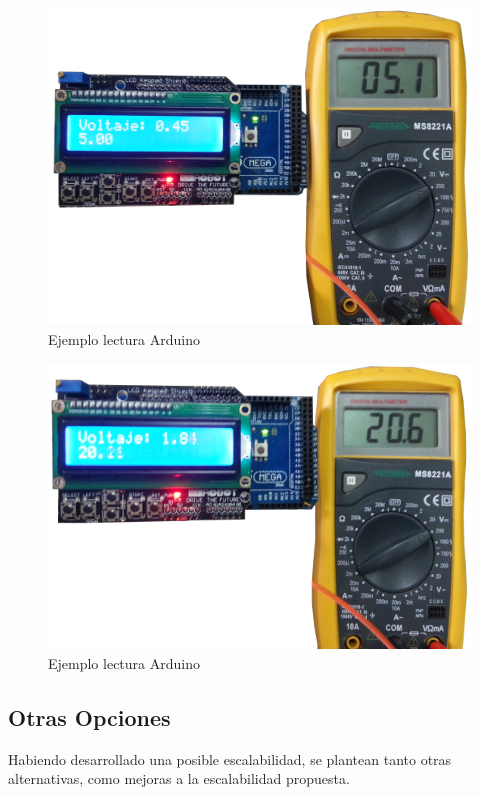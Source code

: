 \documentclass[12pt,a4paper]{article}
\begin{document}
			\begin{figure}[H]
			\centering
				\includegraphics[scale=0.7]{images/arduino5.png}\caption{Ejemplo lectura Arduino}
			\end{figure}

			\begin{figure}[H]
			\centering
				\includegraphics[scale=0.7]{images/arduino6.png}\caption{Ejemplo lectura Arduino}
			\end{figure}

		\subsection{Otras Opciones}

			Habiendo desarrollado una posible escalabilidad, se plantean tanto otras alternativas, como mejoras a la escalabilidad propuesta.
\end{document}
